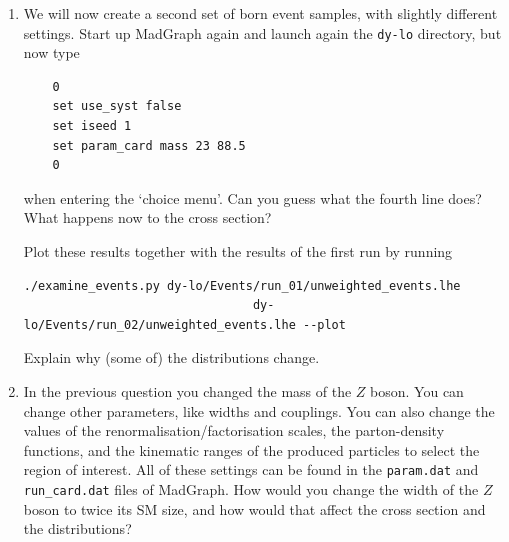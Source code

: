 \documentclass{article}
\begin{document}
\begin{enumerate}
Next we will plot the distribution. Run 
\begin{verbatim}
./examine_events.py dy-lo/Events/run_01/unweighted_events.lhe --plot
\end{verbatim}
This creates three plots, one for each distribution. 
%
Explain the shape of the transverse momentum of the lepton pair, and of the invariant mass spectrum. 
\item We will now create a second set of born event samples, with slightly different settings. Start up MadGraph again and launch again the \texttt{dy-lo} directory, but now type
\begin{verbatim}
	0
	set use_syst false
	set iseed 1
	set param_card mass 23 88.5	 
	0
\end{verbatim}
when entering the `choice menu'. Can you guess what the fourth line does? What happens now to the cross section? 

Plot these results together with the results of the first run by running
\begin{verbatim}
./examine_events.py dy-lo/Events/run_01/unweighted_events.lhe
                                dy-lo/Events/run_02/unweighted_events.lhe --plot 
\end{verbatim} 
Explain why (some of) the distributions change. 
\item In the previous question you changed the mass of the $Z$ boson. You can change other parameters, like widths and couplings. You can also change the values of the renormalisation/factorisation scales, the parton-density functions, and the kinematic ranges of the produced particles to select the region of interest. All of these settings can be found in the \texttt{param.dat} and \texttt{run\_card.dat} files of MadGraph. How would you change the width of the $Z$ boson to twice its SM size, and how would that affect the cross section and the distributions?
\end{enumerate}

\newpage
\end{document}
